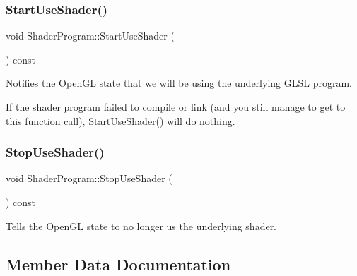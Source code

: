 \subsubsection{\texorpdfstring{Start\+Use\+Shader()}{StartUseShader()}}
{\footnotesize\ttfamily void Shader\+Program\+::\+Start\+Use\+Shader (\begin{DoxyParamCaption}{ }\end{DoxyParamCaption}) const\hspace{0.3cm}{\ttfamily [virtual]}}



Notifies the Open\+GL state that we will be using the underlying G\+L\+SL program.

If the shader program failed to compile or link (and you still manage to get to this function call), \hyperlink{class_shader_program_aab1241c0f0962d43687d92866d7b7d6a}{Start\+Use\+Shader()} will do nothing. \hypertarget{class_shader_program_a2f2ae9ab4849f855becccfaa445d00d5}{}\label{class_shader_program_a2f2ae9ab4849f855becccfaa445d00d5}
\subsubsection{\texorpdfstring{Stop\+Use\+Shader()}{StopUseShader()}}
{\footnotesize\ttfamily void Shader\+Program\+::\+Stop\+Use\+Shader (\begin{DoxyParamCaption}{ }\end{DoxyParamCaption}) const\hspace{0.3cm}{\ttfamily [virtual]}}



Tells the Open\+GL state to no longer us the underlying shader.



\subsection{Member Data Documentation}
\hypertarget{class_shader_program_a8839da24bcba7d96ce590146523a8d47}{}\label{class_shader_program_a8839da24bcba7d96ce590146523a8d47}
